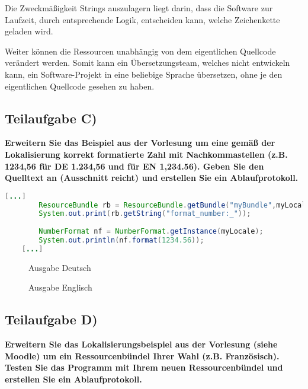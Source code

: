 Die Zweckmäßigkeit Strings auszulagern liegt darin, dass die Software zur
Laufzeit, durch entsprechende Logik, entscheiden kann, welche Zeichenkette
geladen wird.

Weiter können die Ressourcen unabhängig von dem eigentlichen Quellcode verändert
werden. Somit kann ein Übersetzungsteam, welches nicht entwickeln kann, ein
Software-Projekt in eine beliebige Sprache übersetzen, ohne je den eigentlichen
Quellcode gesehen zu haben.


\subsection{Teilaufgabe C)}
\textbf{Erweitern Sie das Beispiel aus der Vorlesung um eine gemäß der Lokalisierung korrekt
formatierte Zahl mit Nachkommastellen (z.B. 1234,56 für DE 1.234,56 und für EN
1,234.56). Geben Sie den Quelltext an (Ausschnitt reicht) und erstellen Sie ein
Ablaufprotokoll.}

\begin{lstlisting}[language=java, style=java, caption={NumberFormat},
label={lst:lst1}]
	[...]
        ResourceBundle rb = ResourceBundle.getBundle("myBundle",myLocale);
        System.out.print(rb.getString("format_number:_"));
        
        NumberFormat nf = NumberFormat.getInstance(myLocale);
        System.out.println(nf.format(1234.56));       
    [...]
\end{lstlisting}
\begin{figure}[htb]
\begin{center}
\caption{Ausgabe Deutsch}
\end{center}
\end{figure}

\begin{figure}[htb]
\begin{center}
\caption{Ausgabe Englisch}
\end{center}
\end{figure}

\clearpage
\subsection{Teilaufgabe D)}
\textbf{Erweitern Sie das Lokalisierungsbeispiel aus der Vorlesung (siehe Moodle) um ein
Ressourcenbündel Ihrer Wahl (z.B. Französisch). Testen Sie das Programm mit Ihrem
neuen Ressourcenbündel und erstellen Sie ein Ablaufprotokoll.}

